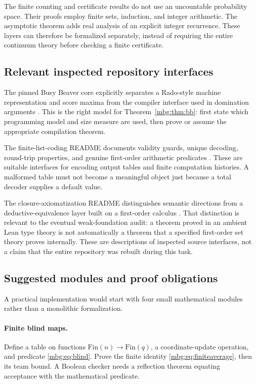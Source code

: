 \documentclass[11pt,letterpaper]{article}
\theoremstyle{definition}
\begin{document}
The finite counting and certificate results do not use an uncountable probability space. Their proofs employ finite sets, induction, and integer arithmetic. The asymptotic theorem adds real analysis of an explicit integer recurrence. These layers can therefore be formalized separately, instead of requiring the entire continuum theory before checking a finite certificate.

\subsection{Relevant inspected repository interfaces}
The pinned Busy Beaver core explicitly separates a Rado-style machine representation and score maxima from the compiler interface used in domination arguments \cite{BusyBeaver}. This is the right model for Theorem~\ref{mbg:thm:bb}: first state which programming model and size measure are used, then prove or assume the appropriate compilation theorem.

The finite-list-coding README documents validity guards, unique decoding, round-trip properties, and genuine first-order arithmetic predicates \cite{ListCoding}. These are suitable interfaces for encoding output tables and finite computation histories. A malformed table must not become a meaningful object just because a total decoder supplies a default value.

The closure-axiomatization README distinguishes semantic directions from a deductive-equivalence layer built on a first-order calculus \cite{Closure}. That distinction is relevant to the eventual weak-foundation audit: a theorem proved in an ambient Lean type theory is not automatically a theorem that a specified first-order set theory proves internally. These are descriptions of inspected source interfaces, not a claim that the entire repository was rebuilt during this task.

\subsection{Suggested modules and proof obligations}
A practical implementation would start with four small mathematical modules rather than a monolithic formalization.

\paragraph{Finite blind maps.}
Define a table on functions $\mathrm{Fin}(n)\to\mathrm{Fin}(q)$, a coordinate-update operation, and predicate \eqref{mbg:eq:blind}. Prove the finite identity \eqref{mbg:eq:finiteaverage}, then its team bound. A Boolean checker needs a reflection theorem equating acceptance with the mathematical predicate.
\end{document}
